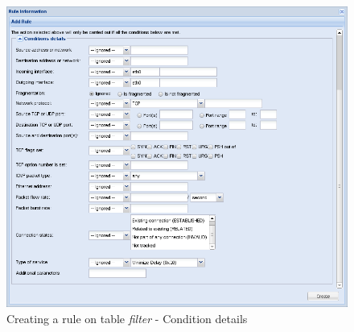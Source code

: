 \begin{figure}[H]
    \begin{center}
    \includegraphics[scale=0.38]{screenshots/etfw/etfw_firewall_03.png}
    \caption{Creating a rule on table \textit{filter} - Condition details}
    \label{fig:etfw_firewall_03}
    \end{center}
\end{figure}

